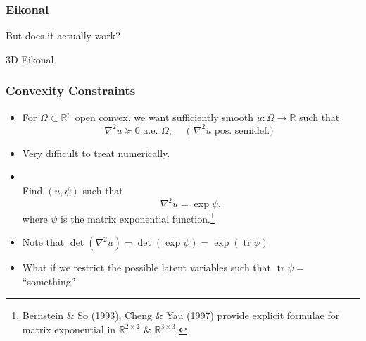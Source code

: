 \documentclass[aspectratio=169,xcolor=dvipsnames,11pt]{beamer}
\begin{document}
\begin{frame}\frametitle{Eikonal}
{\Large
{\color{Maroon}
But does it actually work?
}
}
\end{frame}


\begin{frame}{3D Eikonal}
\end{frame}


\begin{frame}\frametitle{Convexity Constraints}
\begin{itemize}
\item For  $\Omega \subset \mathbb R^n$ open convex, we want sufficiently smooth $u: \Omega \to \mathbb R$ such that
\begin{equation*}
    \nabla^2 u \succeq 0 \text{ a.e. } \Omega, \quad \text{ ( $\nabla^2 u$ pos. semidef.) }
    \,
\end{equation*}
\item \pause Very difficult to treat numerically. 
\item {}\\ \pause Find $(u,\psi)$ such that
\[
   \nabla^2 u = \exp \psi,
\]
where $\psi$ is the matrix exponential function.\footnote{\scriptsize Bernstein \& So (1993), Cheng \& Yau (1997) provide explicit formulae for matrix exponential in
	$\mathbb R^{2 \times 2}$ \&  $\mathbb R^{3 \times 3}$.}
\item \pause Note that $\operatorname{det} (\nabla^2 u) = \operatorname{det}(\exp \psi) = \exp( \operatorname{tr} \psi )$
\item {\color{Red} What if we restrict the possible latent variables such that $\operatorname{tr} \psi = $ ``something''}
\end{itemize}
\end{frame}
\end{document}
